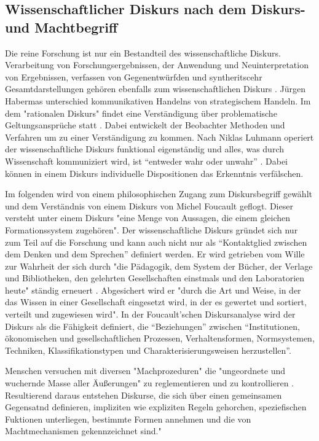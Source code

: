 \subsection{Wissenschaftlicher Diskurs nach dem Diskurs- und Machtbegriff}

Die reine Forschung ist nur ein Bestandteil des wissenschaftliche Diskurs\cite{suchen}. Verarbeitung von Forschungsergebnissen, der Anwendung und Neuinterpretation von Ergebnissen, verfassen von Gegenentwürfden und syntheritscehr Gesamtdarstellungen gehören ebenfalls zum wissenschaftlichen Diskurs \cite{suchen}. Jürgen Habermas unterschied kommunikativen Handelns von strategischem Handeln. Im dem "rationalen Diskurs" findet eine Verständigung über problematische Geltungsansprüche statt \cite{suchen}. Dabei entwickelt der Beobachter Methoden und Verfahren um zu einer Verständigung zu kommen. \cite{suchen} Nach Niklas Luhmann operiert der wissenschaftliche Diskurs funktional eigenständig und alles, was durch Wissenschaft kommuniziert wird, ist “entweder wahr oder unwahr” \cite{Luhmann1998}.  Dabei können in einem Diskurs individuelle Dispositionen das Erkenntnis verfälschen.

Im folgenden wird von einem philosophischen Zugang zum Diskursbegriff gewählt und dem Verständnis von einem Diskurs von Michel Foucault geflogt. Dieser versteht unter einem Diskurs "eine Menge von Aussagen, die einem gleichen Formationssystem zugehören"\cite{foucault_archaologie_1981}. Der wissenschaftliche Diskurs gründet sich nur zum Teil auf die Forschung und kann auch nicht nur als “Kontaktglied zwischen dem Denken und dem Sprechen” \cite{foucault_ordnung_2003} definiert werden. Er wird getrieben vom Wille zur Wahrheit der sich durch "die Pädagogik, dem System der Bücher, der Verlage und Bibliotheken, den gelehrten Gesellschaften einstmals und den Laboratorien heute" ständig erneuert \cite{foucault_ordnung_2003}. Abgesichert wird er "durch die Art und Weise, in der das Wissen in einer Gesellschaft eingesetzt wird, in der es gewertet und sortiert, verteilt und zugewiesen wird"\cite{foucault_ordnung_2003}. In der Foucault'schen Diskursanalyse wird der Diskurs als die Fähigkeit definiert, die “Beziehungen” zwischen “Institutionen, ökonomischen und gesellschaftlichen Prozessen, Verhaltensformen, Normsystemen, Techniken, Klassifikationstypen und Charakterisierungsweisen herzustellen”\cite{foucault_archaologie_1981}.

Menschen versuchen mit diversen "Machprozeduren" die "ungeordnete und wuchernde Masse aller Äußerungen" zu reglementieren und zu kontrollieren \cite{Neymeyer_diskurs_2010}. Resultierend daraus entstehen Diskurse, die sich über einen gemeinsamen Gegensatnd definieren, impliziten wie expliziten Regeln gehorchen, speziefischen Fuktionen unterliegen, bestimmte Formen annehmen und die von Machtmechanismen gekennzeichnet sind." \cite{Neymeyer_diskurs_2010}

